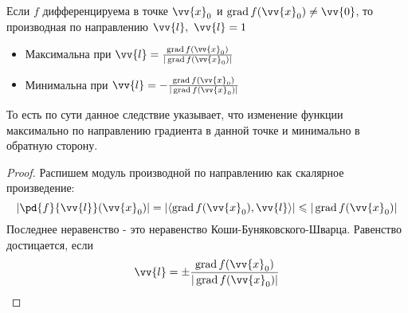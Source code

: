 \begin{corollary}
	Если $f$ дифференцируема в точке $\vv{x}_0$ и $\grad f(\vv{x}_0) \neq \vv{0}$, то производная по направлению $\vv{l},\ \vv{l} = 1$
	\begin{itemize}
		\item Максимальна при $\vv{l} = \frac{\grad f(\vv{x}_0)}{|\grad f(\vv{x}_0)|}$
		
		\item Минимальна при $\vv{l} = -\frac{\grad f(\vv{x}_0)}{|\grad f(\vv{x}_0)|}$
	\end{itemize}
\end{corollary}

\begin{note}
	То есть по сути данное следствие указывает, что изменение функции максимально по направлению градиента в данной точке и минимально в обратную сторону.
\end{note}

\begin{proof}
	Распишем модуль производной по направлению как скалярное произведение:
	\[
		\left|\pd{f}{\vv{l}} (\vv{x}_0)\right| = \left|\trbr{\grad f(\vv{x}_0), \vv{l}}\right| \le |\grad f(\vv{x}_0)|
	\]
	Последнее неравенство - это неравенство Коши-Буняковского-Шварца. Равенство достицается, если
	\[
		\vv{l} = \pm \frac{\grad f(\vv{x}_0)}{|\grad f(\vv{x}_0)|}
	\]
\end{proof}